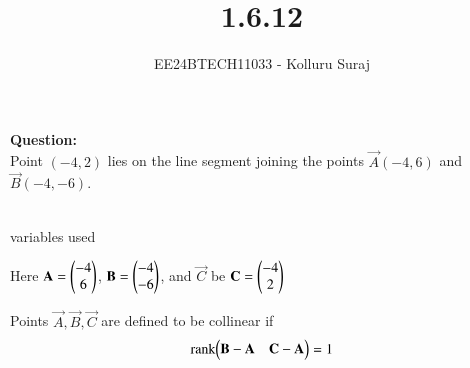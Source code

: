 \documentclass[journal]{IEEEtran}
\begin{document}

\vspace{3cm}

\title{1.6.12}
\author{EE24BTECH11033 - Kolluru Suraj
}
{\let\newpage\relax\maketitle}

\renewcommand{\thefigure}{\theenumi}
\renewcommand{\thetable}{\theenumi}
\setlength{\intextsep}{10pt} %


\renewcommand{\thetable}{\theenumi}
\textbf{Question:}\\
Point $ (-4, 2)$ lies on the line segment joining the points $ \vec{A}(-4, 6)$  and  $\vec{B}(-4, -6)$.
\\
\solution\\
\begin{table}[h!]
  \centering
  
  \caption{variables used}
  \label{tabQuestion-1.6.12}
\end{table} 

Here $\mathbf{A}=\begin{pmatrix}-4 \\ 6\end{pmatrix}$, $\mathbf{B}=\begin{pmatrix}-4 \\ -6\end{pmatrix}$, and $\vec{C}$ be $\mathbf{C}=\begin{pmatrix}-4 \\ 2\end{pmatrix}$

Points $\vec{A}, \vec{B}, \vec{C}$ are defined to be collinear if 
		\begin{align}
			\label{eq:line-rank-2}
			\text{rank}{\ensuremath{\begin{pmatrix}\mathbf{B}-\mathbf{A}& \mathbf{C}-\mathbf{A}\end{pmatrix}}} = 1
		\end{align}
\end{document}
